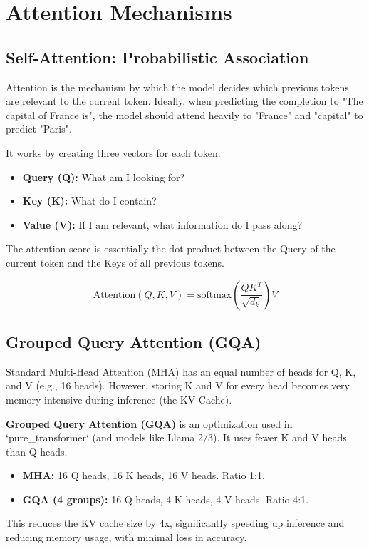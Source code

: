 \chapter{Attention Mechanisms}

\section{Self-Attention: Probabilistic Association}
Attention is the mechanism by which the model decides which previous tokens are relevant to the current token. Ideally, when predicting the completion to "The capital of France is", the model should attend heavily to "France" and "capital" to predict "Paris".

It works by creating three vectors for each token:
\begin{itemize}
    \item \textbf{Query (Q):} What am I looking for?
    \item \textbf{Key (K):} What do I contain?
    \item \textbf{Value (V):} If I am relevant, what information do I pass along?
\end{itemize}

The attention score is essentially the dot product between the Query of the current token and the Keys of all previous tokens.

$$ \text{Attention}(Q, K, V) = \text{softmax}\left(\frac{QK^T}{\sqrt{d_k}}\right)V $$

\section{Grouped Query Attention (GQA)}
Standard Multi-Head Attention (MHA) has an equal number of heads for Q, K, and V (e.g., 16 heads). However, storing K and V for every head becomes very memory-intensive during inference (the KV Cache).

\textbf{Grouped Query Attention (GQA)} is an optimization used in `pure_transformer` (and models like Llama 2/3). It uses fewer K and V heads than Q heads.

\begin{itemize}
    \item \textbf{MHA:} 16 Q heads, 16 K heads, 16 V heads. Ratio 1:1.
    \item \textbf{GQA (4 groups):} 16 Q heads, 4 K heads, 4 V heads. Ratio 4:1.
\end{itemize}

This reduces the KV cache size by 4x, significantly speeding up inference and reducing memory usage, with minimal loss in accuracy.


